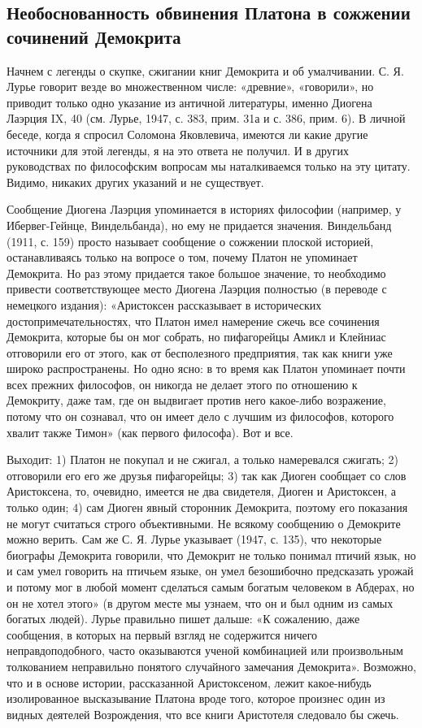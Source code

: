 \subsection{Необоснованность обвинения Платона в сожжении сочинений
Демокрита}

Начнем с легенды о скупке, сжигании книг Демокрита и об
умалчивании. С. Я. Лурье говорит везде во множественном числе:
«древние», «говорили», но приводит только одно указание из античной
литературы, именно Диогена Лаэрция IX, 40 (см. Лурье, 1947, с. 383,
прим. 31а и с. 386, прим. 6). В личной беседе, когда я спросил
Соломона Яковлевича, имеются ли какие другие источники для этой
легенды, я на это ответа не получил. И в других руководствах по
философским вопросам мы наталкиваемся только на эту цитату. Видимо,
никаких других указаний и не существует.

Сообщение Диогена Лаэрция упоминается в историях философии (например,
у Ибервег-Гейнце, Виндельбанда), но ему не придается значения.
Виндельбанд (1911, с. 159) просто называет сообщение о сожжении
плоской историей, останавливаясь только на вопросе о том, почему
Платон не упоминает Демокрита. Но раз этому придается такое большое
значение, то необходимо привести соответствующее место Диогена Лаэрция
полностью (в переводе с немецкого издания): «Аристоксен рассказывает в
исторических достопримечательностях, что Платон имел намерение сжечь
все сочинения Демокрита, которые бы он мог собрать, но пифагорейцы
Амикл и Клейниас отговорили его от этого, как от бесполезного
предприятия, так как книги уже широко распространены. Но одно ясно: в
то время как Платон упоминает почти всех прежних философов, он никогда
не делает этого по отношению к Демокриту, даже там, где он выдвигает
против него какое-либо возражение, потому что он сознавал, что он
имеет дело с лучшим из философов, которого хвалит также Тимон» (как
первого философа). Вот и все.

Выходит: 1) Платон не покупал и не сжигал, а только намеревался
сжигать; 2) отговорили его его же друзья пифагорейцы; 3) так как
Диоген сообщает со слов Аристоксена, то, очевидно, имеется не два
свидетеля, Диоген и Аристоксен, а только один; 4) сам Диоген явный
сторонник Демокрита, поэтому его показания не могут считаться строго
объективными. Не всякому сообщению о Демокрите можно верить. Сам же С.
Я. Лурье указывает (1947, с. 135), что некоторые биографы Демокрита
говорили, что Демокрит не только понимал птичий язык, но и сам умел
говорить на птичьем языке, он умел безошибочно предсказать урожай и
потому мог в любой момент сделаться самым богатым человеком в Абдерах,
но он не хотел этого» (в другом месте мы узнаем, что он и был одним из
самых богатых людей). Лурье правильно пишет дальше: «К сожалению, даже
сообщения, в которых на первый взгляд не содержится ничего
неправдоподобного, часто оказываются ученой комбинацией или
произвольным толкованием неправильно понятого случайного замечания
Демокрита». Возможно, что и в основе истории, рассказанной
Аристоксеном, лежит какое-нибудь изолированное высказывание Платона
вроде того, которое произнес один из видных деятелей Возрождения, что
все книги Аристотеля следовало бы сжечь.

